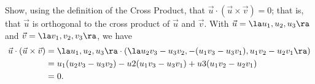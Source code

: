 {Show, using the definition of the Cross Product, that $\vec u\cdot(\vec u\times\vec v)=0$; that is, that $\vec u$ is orthogonal to the cross product of $\vec u$ and $\vec v$.}
{With $\vec u = \la u_1,u_2,u_3\ra$ and $\vec v = \la v_1,v_2,v_3\ra$, we have
\begin{align*}
\vec u\cdot(\vec u\times\vec v) &= \la u_1,u_2,u_3\ra\cdot (\la u_2v_3-u_3v_2,-(u_1v_3-u_3v_1),u_1v_2-u_2v_1\ra) \\
		&= u_1(u_2v_3-u_3v_2) - u2(u_1v_3-u_3v_1)+u3(u_1v_2-u_2v_1)\\
		&=0.
\end{align*}
}